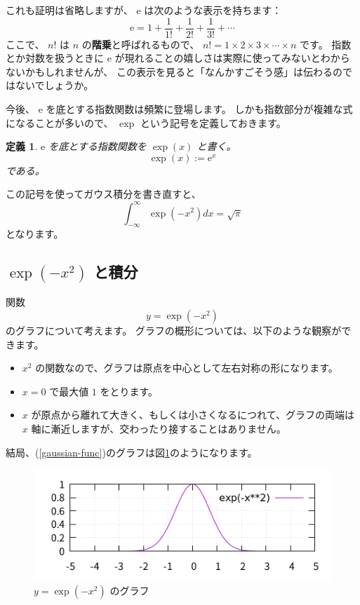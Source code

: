 \documentclass[uplatex,dvipdfmx]{jsarticle}
\newtheorem{dfn}[thm]{定義}
\begin{document}
  これも証明は省略しますが、 $\mathrm{e}$ は次のような表示を持ちます：
  \[
    \mathrm{e} = 1 + \frac{1}{1!} + \frac{1}{2!} + \frac{1}{3!} + \cdots
  \]
  ここで、 $n!$ は $n$ の\textbf{階乗}と呼ばれるもので、
  $n! = 1 \times 2 \times 3 \times \cdots \times n$ です。
  指数とか対数を扱うときに $\mathrm{e}$ が現れることの嬉しさは実際に使ってみないとわからないかもしれませんが、
  この表示を見ると「なんかすごそう感」は伝わるのではないでしょうか。

  今後、 $\mathrm{e}$ を底とする指数関数は頻繁に登場します。
  しかも指数部分が複雑な式になることが多いので、 $\exp$ という記号を定義しておきます。
  \begin{dfn}
    $\mathrm{e}$ を底とする指数関数を $\exp(x)$ と書く。
    \[
      \exp(x) := \mathrm{e}^x
    \]
    である。
  \end{dfn}

  この記号を使ってガウス積分を書き直すと、
  \[
    \int_{-\infty}^{\infty}\exp(-x^2)dx = \sqrt{\pi}
  \]
  となります。

\subsection{$\exp(-x^2)$ と積分}
  関数
  \begin{equation}
    \label{gaussian-func}
    y = \exp(-x^2)
  \end{equation}
  のグラフについて考えます。
  グラフの概形については、以下のような観察ができます。
  \begin{itemize}
    \item $x^2$ の関数なので、グラフは原点を中心として左右対称の形になります。
    \item $x = 0$ で最大値 $1$ をとります。
    \item $x$ が原点から離れて大きく、もしくは小さくなるにつれて、グラフの両端は $x$ 軸に漸近しますが、交わったり接することはありません。
  \end{itemize}
  結局、(\ref{gaussian-func})のグラフは図\ref{gaussian1}のようになります。
  \begin{figure}
    \centering
    \includegraphics[width=15cm]{gaussian1.png}
    \caption{$y = \exp(-x^2)$ のグラフ}
    \label{gaussian1}
  \end{figure}
\end{document}
